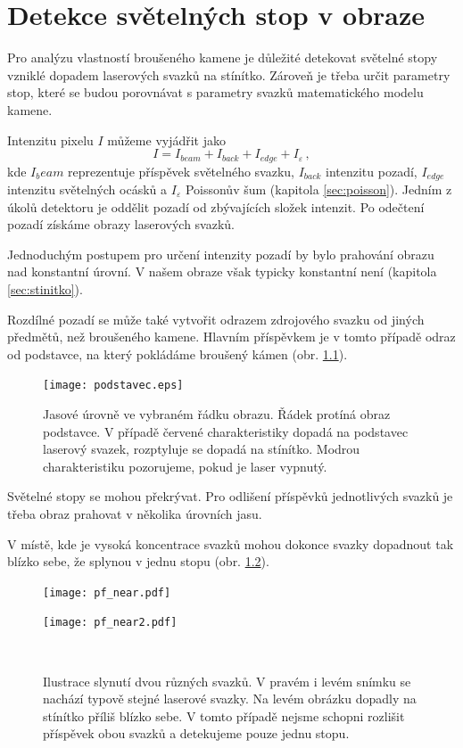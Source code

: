 \chapter{Detekce světelných stop v obraze}
Pro analýzu vlastností broušeného kamene je důležité detekovat světelné stopy vzniklé dopadem laserových svazků na stínítko. Zároveň je třeba určit parametry stop, které se budou porovnávat s parametry svazků matematického modelu kamene. 

Intenzitu pixelu $I$ můžeme vyjádřit jako 
\begin{equation}
	I = I_{beam}+I_{back}+I_{edge}+I_{\varepsilon}\,,
	\label{eq:intensitu_sum}
\end{equation}
 kde $I_beam$ reprezentuje příspěvek světelného svazku, $I_{back}$ intenzitu pozadí, $I_{edge}$ intenzitu světelných ocásků a $I_{\varepsilon}$ Poissonův šum (kapitola \ref{sec:poisson}). Jedním z úkolů detektoru je oddělit pozadí od zbývajících složek intenzit. Po odečtení pozadí získáme obrazy laserových svazků.   
 
Jednoduchým postupem pro určení intenzity pozadí by bylo prahování obrazu nad konstantní úrovní. V našem obraze však typicky konstantní není (kapitola \ref{sec:stinitko}). 

Rozdílné pozadí se může také vytvořit odrazem zdrojového svazku od jiných předmětů, než broušeného kamene. Hlavním příspěvkem je v tomto případě odraz od podstavce, na který pokládáme broušený kámen (obr. \ref{fig: podstavec}).

\begin{figure}[htps]
\centering
\texttt{[image: podstavec.eps]}
\caption{Jasové úrovně ve vybraném řádku obrazu. Řádek protíná obraz podstavce. V případě červené charakteristiky dopadá na podstavec laserový svazek, rozptyluje se dopadá na stínítko. Modrou charakteristiku pozorujeme, pokud je laser vypnutý.}
\label{fig: podstavec}
\end{figure}

Světelné stopy se mohou překrývat. Pro odlišení příspěvků jednotlivých svazků je třeba obraz prahovat v několika úrovních jasu.

V místě, kde je vysoká koncentrace svazků mohou dokonce svazky dopadnout tak blízko sebe, že splynou v jednu stopu (obr. \ref{Splynuti}).  

\begin{figure}[htbp]
    \centering
    \begin{minipage}[c]{0.48\textwidth}
        \centering\texttt{[image: pf\_near.pdf]}
    \end{minipage}
    \begin{minipage}[c]{0.48\textwidth}
        \centering\texttt{[image: pf\_near2.pdf]}
    \end{minipage}
    \\
        \caption[Slynutí dvou různých svazků.]{Ilustrace slynutí dvou různých svazků. V pravém i levém snímku se nachází typově stejné laserové svazky. Na levém obrázku dopadly na stínítko příliš blízko sebe. V tomto případě nejsme schopni rozlišit příspěvek obou svazků a detekujeme pouze jednu stopu.}
        \label{Splynuti}
\end{figure}

